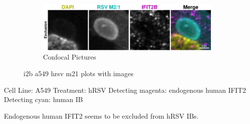 \begin{figure}
    \begin{subfigure}{1\textwidth}
    \includegraphics[width=1\linewidth]{10. Chapter 5/Figs/01. Infection/02. IFIT2B/09. i2b a549 hrsv m21.pdf} 
    \caption[]{Confocal Pictures}
    \end{subfigure}
    \caption[i2b a549 hrsv m21 plots with images]{i2b a549 hrsv m21 plots with images}
    \label{fig:i2b a549 hrsv m21 plots with images}
\end{figure}

Cell Line: A549 \newline
Treatment: hRSV \newline
Detecting magenta: endogenous human IFIT2  \newline
Detecting cyan: human IB \newline

Endogenous human IFIT2 seems to be excluded from hRSV IBs.

